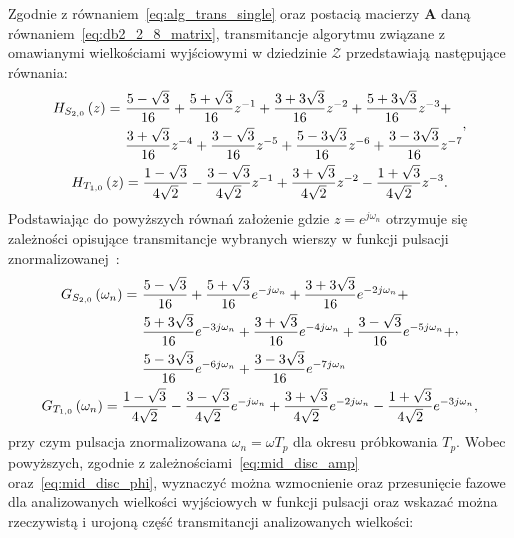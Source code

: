 Zgodnie z równaniem~\eqref{eq:alg_trans_single} oraz postacią macierzy $\mathbf{A}$ daną równaniem~\eqref{eq:db2_2_8_matrix}, transmitancje algorytmu związane z omawianymi wielkościami wyjściowymi w dziedzinie $\mathcal{Z}$ przedstawiają następujące równania:
\begin{gather}
\begin{split}
H_{S_{2,0}} \left(z\right) = ~
& \frac{5 - \sqrt{3}}{16} + \frac{5 + \sqrt{3}}{16} z^{-1} + \frac{3 + 3 \sqrt{3}}{16} z^{-2} + \frac{5 + 3 \sqrt{3}}{16} z^{-3} + \\
& \frac{3 + \sqrt{3}}{16} z^{-4} + \frac{3 - \sqrt{3}}{16} z^{-5} + \frac{5 - 3 \sqrt{3}}{16} z^{-6} + \frac{3 - 3 \sqrt{3}}{16} z^{-7}
\end{split}
\label{eq:sym_partd_output_trans_z_S_2_0}, \\
H_{T_{1,0}} \left(z\right) = \frac{1 - \sqrt{3}}{4 \sqrt{2}} - \frac{3 - \sqrt{3}}{4 \sqrt{2}} z^{-1} + \frac{3 + \sqrt{3}}{4 \sqrt{2}} z^{-2} - \frac{1 + \sqrt{3}}{4 \sqrt{2}} z^{-3} \label{eq:sym_partd_output_trans_z_T_1_0}.
\end{gather}
Podstawiając do powyższych równań założenie gdzie $z = e^{j\omega_{n}}$ otrzymuje się zależności opisujące transmitancje wybranych wierszy w funkcji pulsacji znormalizowanej~\cite{oppenheim_dsp}:
\begin{gather}
\begin{split}
G_{S_{2,0}} \left(\omega_{n}\right) = ~
& \frac{5 - \sqrt{3}}{16} + \frac{5 + \sqrt{3}}{16} e^{-j\omega_{n}} + \frac{3 + 3 \sqrt{3}}{16} e^{-2j\omega_{n}} + \\
& \frac{5 + 3 \sqrt{3}}{16} e^{-3j\omega_{n}} + \frac{3 + \sqrt{3}}{16} e^{-4j\omega_{n}} + \frac{3 - \sqrt{3}}{16} e^{-5j\omega_{n}} + \\
& \frac{5 - 3 \sqrt{3}}{16} e^{-6j\omega_{n}} + \frac{3 - 3 \sqrt{3}}{16} e^{-7j\omega_{n}}
\end{split}
\label{eq:sym_partd_output_trans_wn_S_2_0}, \\
G_{T_{1,0}} \left(\omega_{n}\right) = \frac{1 - \sqrt{3}}{4 \sqrt{2}} - \frac{3 - \sqrt{3}}{4 \sqrt{2}} e^{-j\omega_{n}} + \frac{3 + \sqrt{3}}{4 \sqrt{2}} e^{-2j\omega_{n}} - \frac{1 + \sqrt{3}}{4 \sqrt{2}} e^{-3j\omega_{n}} \label{eq:sym_partd_output_trans_wn_T_1_0},
\end{gather}
przy czym pulsacja znormalizowana $\omega_{n} = \omega T_{p}$ dla okresu próbkowania $T_{p}$. Wobec powyższych, zgodnie z zależnościami~\eqref{eq:mid_disc_amp} oraz~\eqref{eq:mid_disc_phi}, wyznaczyć można wzmocnienie oraz przesunięcie fazowe dla analizowanych wielkości wyjściowych w funkcji pulsacji oraz wskazać można rzeczywistą i urojoną część transmitancji analizowanych wielkości:
